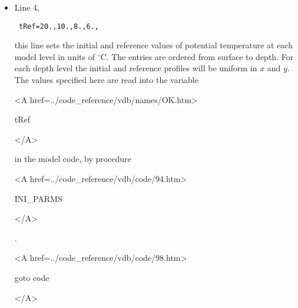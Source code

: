\begin{itemize}

\item Line 4, 
\begin{verbatim} tRef=20.,10.,8.,6., \end{verbatim} 
this line sets
the initial and reference values of potential temperature at each model
level in units of $^{\circ}$C.
The entries are ordered from surface to depth. For each
depth level the initial and reference profiles will be uniform in
$x$ and $y$. The values specified here are read into the
variable 
{\bf
\begin{rawhtml} <A href=../code_reference/vdb/names/OK.htm> \end{rawhtml}
tRef
\begin{rawhtml} </A>\end{rawhtml}
} 
in the model code, by procedure 
{\it
\begin{rawhtml} <A href=../code_reference/vdb/code/94.htm> \end{rawhtml}
INI\_PARMS
\begin{rawhtml} </A>\end{rawhtml}
}.

\newcommand{\VARtref}{
{\bf
\begin{rawhtml} <A href=../code_reference/vdb/names/OK.htm> \end{rawhtml}
tRef
\begin{rawhtml} </A>\end{rawhtml}
} 
}



{\bf
\begin{rawhtml} <A href=../code_reference/vdb/code/98.htm> \end{rawhtml}
goto code
\begin{rawhtml} </A>\end{rawhtml}
}



\end{itemize}
